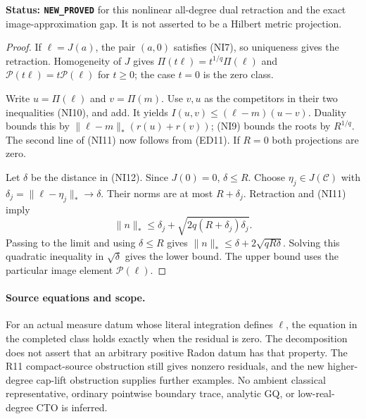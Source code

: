 \noindent\textbf{Status: \texttt{NEW\_PROVED}} for this nonlinear
all-degree dual retraction and the exact image-approximation gap.
It is not asserted to be a Hilbert metric projection.

\begin{proof}
If $\ell=J(a)$, the pair $(a,0)$ satisfies (NI7), so uniqueness
gives the retraction. Homogeneity of $J$ gives
$\Pi(t\ell)=t^{1/q}\Pi(\ell)$ and
$\mathcal P(t\ell)=t\mathcal P(\ell)$ for $t\geq0$;
the case $t=0$ is the zero class.

Write $u=\Pi(\ell)$ and $v=\Pi(m)$. Use $v,u$ as the
competitors in their two inequalities (NI10), and add. It yields
$I(u,v)\leq(\ell-m)(u-v)$. Duality bounds this by
$\|\ell-m\|_*(r(u)+r(v))$; (NI9) bounds the roots by
$R^{1/q}$. The second line of (NI11) now follows from (ED11).
If $R=0$ both projections are zero.

Let $\delta$ be the distance in (NI12). Since $J(0)=0$,
$\delta\leq R$. Choose $\eta_j\in J(\mathscr C)$ with
$\delta_j=\|\ell-\eta_j\|_*\to\delta$. Their norms are
at most $R+\delta_j$. Retraction and (NI11) imply
\[
 \|n\|_*\leq\delta_j+
               \sqrt{2q(R+\delta_j)\delta_j}.
\]
Passing to the limit and using $\delta\leq R$ gives
$\|n\|_*\leq\delta+2\sqrt{qR\delta}$. Solving this
quadratic inequality in $\sqrt\delta$ gives the lower bound.
The upper bound uses the particular image element $\mathcal P(\ell)$.
\end{proof}

\paragraph{Source equations and scope.}
For an actual measure datum whose literal integration defines $\ell$,
the equation in the completed class holds exactly when the residual
is zero. The decomposition does not assert that an arbitrary positive
Radon datum has that property. The R11 compact-source obstruction
still gives nonzero residuals, and the new higher-degree cap-lift
obstruction supplies further examples. No ambient classical
representative, ordinary pointwise boundary trace, analytic GQ,
or low-real-degree CTO is inferred.
